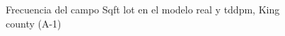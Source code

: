 \begin{figure}[H]
    \centering
    
    \caption{Frecuencia del campo Sqft lot en el modelo real y tddpm, King county (A-1)}
    \label{frecuency-tddpm-sqft lot}
\end{figure}